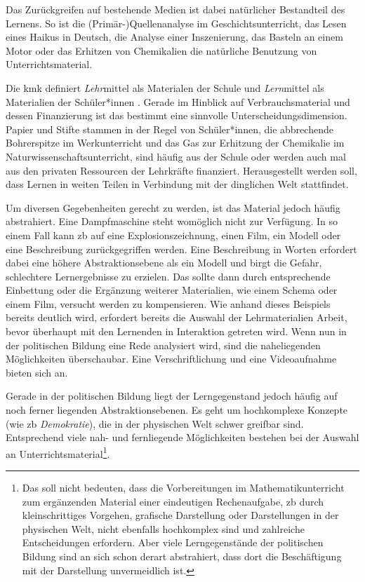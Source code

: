 Das Zurückgreifen auf bestehende Medien ist dabei natürlicher Bestandteil des Lernens. So ist die (Primär-)Quellenanalyse im Geschichtsunterricht, das Lesen eines Haikus in Deutsch, die Analyse einer Inszenierung, das Basteln an einem Motor oder das Erhitzen von Chemikalien die natürliche Benutzung von Unterrichtsmaterial. 

Die \gls{kmk} definiert \emph{Lehr}mittel als Materialen der Schule und \emph{Lern}mittel als Materialien der Schüler*innen \autocite{KMKMittel}. Gerade im Hinblick auf Verbrauchsmaterial und dessen Finanzierung ist das bestimmt eine sinnvolle Unterscheidungsdimension. Papier und Stifte stammen in der Regel von Schüler*innen, die abbrechende Bohrerspitze im Werkunterricht und %
das Gas zur Erhitzung der Chemikalie im Naturwissenschaftsunterricht, sind häufig aus der Schule oder werden auch mal aus den privaten Ressourcen der Lehrkräfte finanziert. Herausgestellt werden soll, dass Lernen in weiten Teilen in Verbindung mit der dinglichen Welt stattfindet.

Um diversen Gegebenheiten gerecht zu werden, ist das Material jedoch häufig abstrahiert. Eine Dampfmaschine steht womöglich nicht zur Verfügung. In so einem Fall kann \gls{zb} auf eine Explosionszeichnung, einen Film, ein Modell oder eine Beschreibung zurückgegriffen werden. Eine Beschreibung in Worten erfordert dabei eine höhere Abstraktionsebene als ein Modell und birgt die Gefahr, schlechtere Lernergebnisse zu erzielen. Das sollte dann durch entsprechende Einbettung oder die Ergänzung weiterer Materialien, wie einem Schema oder einem Film, versucht werden zu kompensieren. Wie anhand dieses Beispiels bereits deutlich wird, erfordert bereits die Auswahl der Lehrmaterialien Arbeit, bevor überhaupt mit den Lernenden in Interaktion getreten wird. 
Wenn nun in der politischen Bildung eine Rede analysiert wird, sind die naheliegenden Möglichkeiten überschaubar. Eine Verschriftlichung und eine Videoaufnahme bieten sich an. 

Gerade in der politischen Bildung liegt der Lerngegenstand jedoch häufig auf noch ferner liegenden Abstraktionsebenen. Es geht um hochkomplexe Konzepte (wie \gls{zb} \emph{Demokratie}), die in der physischen Welt schwer greifbar sind. Entsprechend viele nah- und fernliegende Möglichkeiten bestehen bei der Auswahl an Unterrichtsmaterial\footnote{Das soll nicht bedeuten, dass die Vorbereitungen im Mathematikunterricht zum ergänzenden Material einer eindeutigen Rechenaufgabe, \gls{zb} durch kleinschrittiges Vorgehen, grafische Darstellung oder Darstellungen in der physischen Welt, nicht ebenfalls hochkomplex sind und zahlreiche Entscheidungen erfordern. Aber viele Lerngegenstände der politischen Bildung sind an sich schon derart abstrahiert, dass dort die Beschäftigung mit der Darstellung unvermeidlich ist.}.

